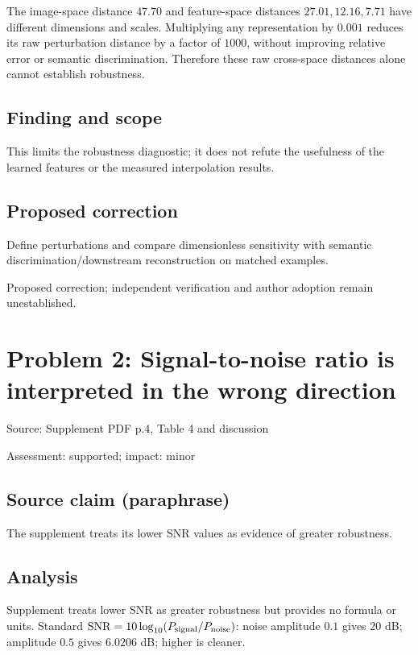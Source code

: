 \documentclass[11pt]{article}
\begin{document}
The image-space distance \(47.70\) and feature-space distances \(27.01,12.16,7.71\) have different dimensions and scales. Multiplying any representation by \(0.001\) reduces its raw perturbation distance by a factor of \(1000\), without improving relative error or semantic discrimination. Therefore these raw cross-space distances alone cannot establish robustness.

\subsection*{Finding and scope}

This limits the robustness diagnostic; it does not refute the usefulness of the learned features or the measured interpolation results.

\subsection*{Proposed correction}

Define perturbations and compare dimensionless sensitivity with semantic discrimination/downstream reconstruction on matched examples.

Proposed correction; independent verification and author adoption remain unestablished.

\section*{Problem 2: Signal-to-noise ratio is interpreted in the wrong direction}

Source: Supplement PDF p.4, Table 4 and discussion

Assessment: supported; impact: minor

\subsection*{Source claim (paraphrase)}

The supplement treats its lower SNR values as evidence of greater robustness.

\subsection*{Analysis}

Supplement treats lower SNR as greater robustness but provides no formula or units. Standard \(\mathrm{SNR}=10\log_{10}(P_{\rm signal}/P_{\rm noise})\): noise amplitude \(0.1\) gives \(20\) dB; amplitude \(0.5\) gives \(6.0206\) dB; higher is cleaner.
\end{document}
